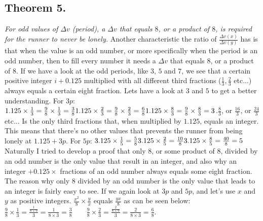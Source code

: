 \documentclass[12pt, a4paper]{article}
\begin{document}
\subsection*{Theorem 5.}\textit{For odd values of $\Delta v$ (period), a $\Delta v$ that equals $8$, or a product of $8$, is required for the runner to never be lonely.}
\newline
\newline
Another characteristic the ratio of $\frac{\Delta v(x)}{\Delta v(y)}$ has is that when the value is an odd number, or more specifically when the period is an odd number, then to fill every number it needs a $\Delta v$ that equals $8$, or a product of $8$. \newline If we have a look at the odd periods, like $3$, $5$ and $7$, we see that a certain positive integer $i+0.125$ multiplied with all different third fractions ($\frac{1}{3}, \frac{2}{3}$ etc...) always equals a certain eight fraction. Lets have a look at $3$ and $5$ to get a better understanding.
\newline
\newline
For $3p$: 
$1.125\times\frac{1}{3} = \frac{9}{8}\times\frac{1}{3} = \frac{3}{8} \newline 1.125\times\frac{2}{3} = \frac{9}{8}\times\frac{2}{3} = \frac{6}{8} \newline 1.125\times\frac{8}{3} = \frac{9}{8}\times\frac{8}{3} = 3$.\newline $\frac{8}{3}$, or $\frac{16}{3}$, or $\frac{24}{3}$ etc... Is the only third fractions that, when multiplied by $1.125$, equals an integer. This means that there's no other values that prevents the runner from being lonely at $1.125+3p$.
\newline
\newline
For $5p$: 
$3.125\times\frac{1}{5} = \frac{5}{8} \newline 3.125\times\frac{2}{5} = \frac{10}{8} \newline 3.125\times\frac{8}{5} = \frac{40}{8} = 5$
\newline
\newline
Naturally I tried to develop a proof that only $8$, or some product of $8$, divided by an odd number is the only value that result in an integer, and also why an integer $+0.125\times$ fractions of an odd number always equals some eight fraction. The reason why only $8$ divided by an odd number is the only value that leads to an integer is fairly easy to see. If we again look at $3p$ and $5p$, and let's use $x$ and $y$ as positive integers.
$\frac{x^2}{8}\times\frac{y}{x}$ equals $\frac{yx}{8}$ as can be seen below: \newline $\frac{9}{8}\times\frac{1}{3} = \frac{\frac{1}{8\times9}}{3} = \frac{1}{8\times3} = \frac{3}{8} \qquad \frac{9}{8}\times\frac{2}{3} = \frac{\frac{2}{8\times9}}{3} = \frac{2}{8\times3} = \frac{6}{8}$.
\end{document}
